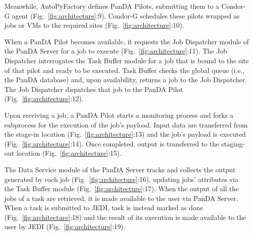 Meanwhile, AutoPyFactory defines PanDA Pilots, submitting them to a Condor-G
agent (Fig.~\ref{fig:architecture}:9). Condor-G schedules these pilots
wrapped as jobs or VMs to the required sites
(Fig.~\ref{fig:architecture}:10).

When a PanDA Pilot becomes available, it requests the Job Dispatcher module
of the PanDA Server for a job to execute (Fig.~\ref{fig:architecture}:11).
The Job Dispatcher interrogates the Task Buffer module for a job that is
bound to the site of that pilot and ready to be executed. Task Buffer checks
the global queue (i.e., the PanDA database) and, upon availability, returns a
job to the Job Dispatcher. The Job Dispatcher dispatches that job to the
PanDA Pilot (Fig.~\ref{fig:architecture}:12).

Upon receiving a job, a PanDA Pilot starts a monitoring process and forks a
subprocess for the execution of the job's payload. Input data are transferred
from the stage-in location (Fig.~\ref{fig:architecture}:13) and the job's
payload is executed (Fig.~\ref{fig:architecture}:14). Once completed, output
is transferred to the staging-out location (Fig.~\ref{fig:architecture}:15).

The Data Service module of the PanDA Server tracks and collects the output
generated by each job (Fig.~\ref{fig:architecture}:16), updating jobs'
attributes via the Task Buffer module (Fig.~\ref{fig:architecture}:17). When
the output of all the jobs of a task are retrieved, it is made available to
the user via PanDA Server. When a task is submitted to JEDI, task is instead
marked as done (Fig.~\ref{fig:architecture}:18) and the result of its
execution is made available to the user by JEDI
(Fig.~\ref{fig:architecture}:19).

